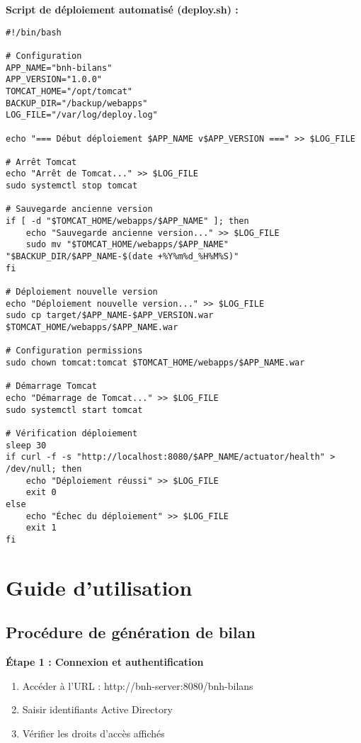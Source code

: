 \textbf{Script de déploiement automatisé (deploy.sh) :}
\begin{verbatim}
#!/bin/bash

# Configuration
APP_NAME="bnh-bilans"
APP_VERSION="1.0.0"
TOMCAT_HOME="/opt/tomcat"
BACKUP_DIR="/backup/webapps"
LOG_FILE="/var/log/deploy.log"

echo "=== Début déploiement $APP_NAME v$APP_VERSION ===" >> $LOG_FILE

# Arrêt Tomcat
echo "Arrêt de Tomcat..." >> $LOG_FILE
sudo systemctl stop tomcat

# Sauvegarde ancienne version
if [ -d "$TOMCAT_HOME/webapps/$APP_NAME" ]; then
    echo "Sauvegarde ancienne version..." >> $LOG_FILE
    sudo mv "$TOMCAT_HOME/webapps/$APP_NAME" "$BACKUP_DIR/$APP_NAME-$(date +%Y%m%d_%H%M%S)"
fi

# Déploiement nouvelle version
echo "Déploiement nouvelle version..." >> $LOG_FILE
sudo cp target/$APP_NAME-$APP_VERSION.war $TOMCAT_HOME/webapps/$APP_NAME.war

# Configuration permissions
sudo chown tomcat:tomcat $TOMCAT_HOME/webapps/$APP_NAME.war

# Démarrage Tomcat
echo "Démarrage de Tomcat..." >> $LOG_FILE
sudo systemctl start tomcat

# Vérification déploiement
sleep 30
if curl -f -s "http://localhost:8080/$APP_NAME/actuator/health" > /dev/null; then
    echo "Déploiement réussi" >> $LOG_FILE
    exit 0
else
    echo "Échec du déploiement" >> $LOG_FILE
    exit 1
fi
\end{verbatim}

\section{Guide d'utilisation}

\subsection{Procédure de génération de bilan}

\textbf{Étape 1 : Connexion et authentification}
\begin{enumerate}
    \item Accéder à l'URL : http://bnh-server:8080/bnh-bilans
    \item Saisir identifiants Active Directory
    \item Vérifier les droits d'accès affichés
\end{enumerate}

